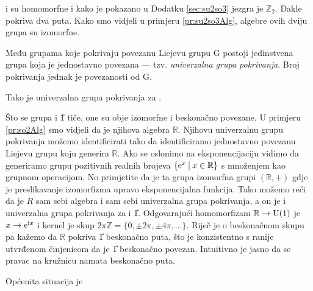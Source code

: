 \begin{primjer}[\SO{3} i \SU{2}]
 i  su homomorfne i kako je pokazano u Dodatku \ref{sec:su2so3} 
jezgra je $\mathbb{Z}_2$. Dakle  pokriva  dva puta.
Kako smo vidjeli u primjeru \ref{pr:su2so3Alg}, algebre ovih
dviju grupa su izomorfne.
\end{primjer}

\begin{teorem}
Među grupama koje pokrivaju povezanu Liejevu grupu G postoji jedinstvena
grupa koja je jednostavno povezana --- tzv. \emph{univerzalna grupa pokrivanja}.
Broj pokrivanja jednak je povezanosti od G. 
\end{teorem}


Tako je  univerzalna grupa pokrivanja za .

\vspace{2ex}
\centerline{}

Što se grupa  i \U{1} tiče, one su obje izomorfne i beskonačno
povezane. U primjeru \ref{pr:so2Alg} smo vidjeli da je njihova
algebra $\mathbb{R}$.
 
Njihovu univerzalnu grupu pokrivanja možemo identificirati
tako da identificiramo jednostavno povezanu Liejevu grupu koju
generira $\mathbb{R}$. Ako se oslonimo na eksponencijaciju
vidimo da generiramo grupu pozitivnih realnih brojeva
$\{\textrm{e}^{x} \: | \: x \in \mathbb{R}\}$ s množenjem kao grupnom operacijom.
No primjetite da je ta grupa izomorfna grupi $(\mathbb{R}, +)$
gdje je preslikavanje izomorfizma upravo eksponencijalna funkcija.
Tako možemo reći da je $R$ sam sebi algebra i sam sebi univerzalna
grupa pokrivanja, a on je i univerzalna grupa pokrivanja za
 i \U{1}. Odgovarajući homomorfizam $\mathbb{R} \to \mathrm{U}(1)$
je $x \to \textrm{e}^{\textrm{i} x}$ i kernel je skup $2\pi\mathbb{Z} = \{0, \pm 2\pi,
\pm 4\pi, \ldots\}$. Riječ je o beskonačnom skupu pa kažemo da
$\mathbb{R}$ pokriva \U{1} beskonačno puta, što je konzistentno
s ranije utvrđenom činjenicom da je \U{1} beskonačno povezan.
Intuitivno je jasno da se pravac na kružnicu namata beskonačno
puta.


Općenita situacija je\\[1ex]

\centerline{}

